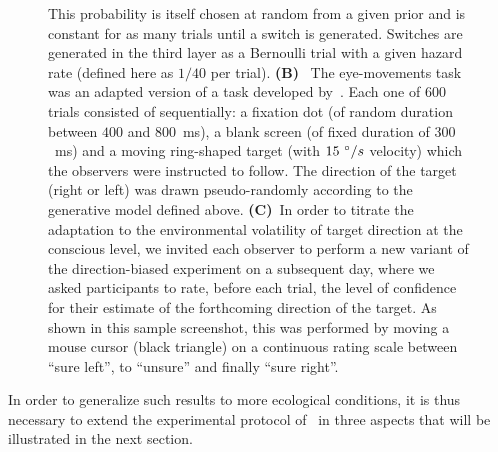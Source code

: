 \documentclass[12pt,english]{article}%
\newcommand{\ms}{\si{\milli\second}}%
\newcommand{\citet}[1]{\textcite{#1}}
\begin{document}
\begin{figure}
{This probability is itself chosen at random from a given prior 
and is constant for as many trials until a switch is generated.
Switches are generated in the third layer as a Bernoulli trial 
with a given hazard rate (defined here as $1/40$ per trial).
\textbf{(B)}~
The eye-movements task was an adapted version of a task developed by~\citet{Montagnini2010}. 
Each one of $600$ trials consisted of sequentially:
a fixation dot (of random duration between $400$ and $800$~\ms),
a blank screen (of fixed duration of  $300$~\ms) and
a moving ring-shaped target (with $15~\degree/s$ velocity) which the observers were instructed to follow.
The direction of the target (right or left) was drawn pseudo-randomly
according to the generative model defined above. 
\textbf{(C)}~In order to titrate the adaptation 
to the environmental volatility of target direction at the conscious level,
we invited each observer to perform a new variant of the direction-biased experiment on a subsequent day,
where we asked participants to rate, before each trial, the level of confidence
for their estimate of the forthcoming direction of the target.
As shown in this sample screenshot,
this was performed by moving a mouse cursor (black triangle) on a continuous rating scale
between ``sure left'', to ``unsure'' and finally ``sure right''.
}
\label{fig:intro}
\end{figure}
In order to generalize such results to more ecological conditions,
it is thus necessary to extend the experimental protocol of~\citet{Montagnini2010} in three aspects that will be illustrated in the next section.
\end{document}
